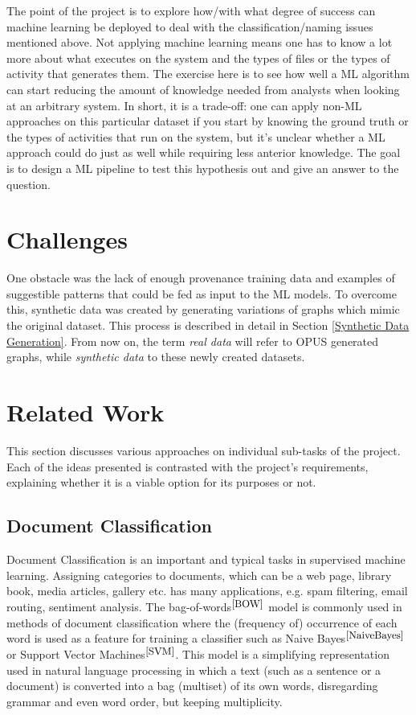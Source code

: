 The point of the project is to explore how/with what degree of success can machine learning be deployed to deal with the classification/naming issues mentioned above. Not applying machine learning means one has to know a lot more about what executes on the system and the types of files or the types of activity that generates them. The exercise here is to see how well a ML algorithm can start reducing the amount of knowledge needed from analysts when looking at an arbitrary system. In short, it is a trade-off: one can apply non-ML approaches on this particular dataset if you start by knowing the ground truth or the types of activities that run on the system, but it's unclear whether a ML approach could do just as well while requiring less anterior knowledge. The goal is to design a ML pipeline to test this hypothesis out and give an answer to the question. 

\section{Challenges}

One obstacle was the lack of enough provenance training data and examples of suggestible patterns that could be fed as input to the ML models. To overcome this, synthetic data was created by generating variations of graphs which mimic the original dataset. This process is described in detail in Section \ref{Synthetic Data Generation}.
From now on, the term \textit{real data} will refer to OPUS generated graphs, while \textit{synthetic data} to these newly created datasets. 

\section{Related Work}

This section discusses various approaches on individual sub-tasks of the project. Each of the ideas presented is contrasted with the project's requirements, explaining whether it is a viable option for its purposes or not. 

\subsection{Document Classification}

Document Classification is an important and typical tasks in supervised machine learning. Assigning categories to documents, which can be a web page, library book, media articles, gallery etc. has many applications, e.g. spam filtering, email routing, sentiment analysis. The bag-of-words$^{\small \cite{BOW}}$ model is commonly used in methods of document classification where the (frequency of) occurrence of each word is used as a feature for training a classifier such as Naive Bayes$^{\small \cite{NaiveBayes}}$ or Support Vector Machines$^{\small \cite{SVM}}$. This model is a simplifying representation used in natural language processing in which a text (such as a sentence or a document) is converted into a bag (multiset) of its own words, disregarding grammar and even word order, but keeping multiplicity. \\

